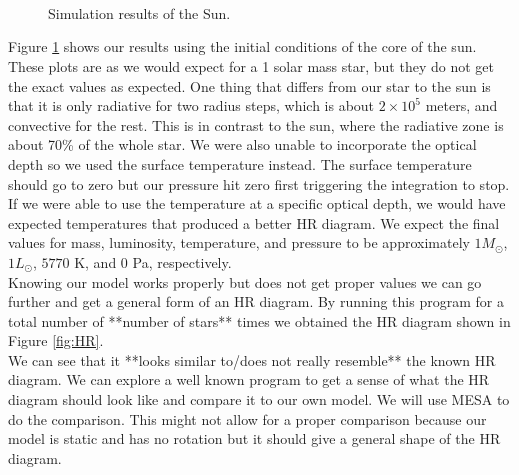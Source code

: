 \documentclass[10pt]{article}
\begin{document}
\begin{figure}[p]
\begin{centering}
 \begin{subfigure}{\textwidth}
  
 \end{subfigure} \\
 \begin{subfigure}{\textwidth}
  
 \end{subfigure} \\
  \begin{subfigure}{\textwidth}
  
 \end{subfigure} \\
   \begin{subfigure}{\textwidth}
  
 \end{subfigure}
 \caption{Simulation results of the Sun.}
 \label{fig:sun}
 \end{centering}
\end{figure}

Figure \ref{fig:sun} shows our results using the initial conditions of the core of the sun. These plots are as we would expect for a 1 solar mass star, but they do not get the exact values as expected. One thing that differs from our star to the sun is that it is only radiative for two radius steps, which is about $2\times 10^5$ meters, and convective for the rest. This is in contrast to the sun, where the radiative zone is about 70\% of the whole star. We were also unable to incorporate the optical depth so we used the surface temperature instead. The surface temperature should go to zero but our pressure hit zero first triggering the integration to stop. If we were able to use the temperature at a specific optical depth, we would have expected temperatures that produced a better HR diagram. We expect the final values for mass, luminosity, temperature, and pressure to be approximately $1 M_\odot$, $1 L_\odot$, $5770$ K, and $0$ Pa, respectively. \\

Knowing our model works properly but does not get proper values we can go further and get a general form of an HR diagram. By running this program for a total number of **number of stars** times we obtained the HR diagram shown in Figure \ref{fig:HR}. \\

We can see that it **looks similar to/does not really resemble** the known HR diagram. We can explore a well known program to get a sense of what the HR diagram should look like and compare it to our own model.  We will use MESA to do the comparison. This might not allow for a proper comparison because our model is static and has no rotation but it should give a general shape of the HR diagram. \\ 
\end{document}

